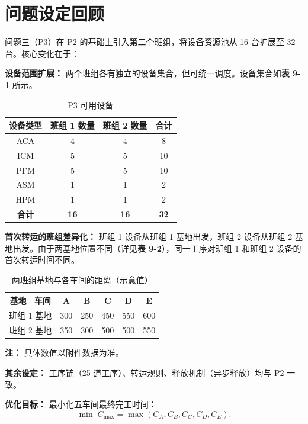\documentclass[UTF8,a4paper,12pt]{ctexart}
\begin{document}
\section{问题设定回顾}
问题三（P3）在 P2 的基础上引入第二个班组，将设备资源池从 16 台扩展至 32 台。核心变化在于：

\textbf{设备范围扩展：} 两个班组各有独立的设备集合，但可统一调度。设备集合如\textbf{表 9-1} 所示。

\begin{table}[htbp]
  \centering
  \caption{P3 可用设备}
  \label{tab:p3_device}
  \begin{tabular}{cccc}
    \toprule
    设备类型 & 班组 1 数量 & 班组 2 数量 & 合计 \\
    \midrule
    ACA & 4 & 4 & 8 \\
    ICM & 5 & 5 & 10 \\
    PFM & 5 & 5 & 10 \\
    ASM & 1 & 1 & 2 \\
    HPM & 1 & 1 & 2 \\
    \textbf{合计} & \textbf{16} & \textbf{16} & \textbf{32} \\
    \bottomrule
  \end{tabular}
\end{table}

\textbf{首次转运的班组差异化：} 班组 1 设备从班组 1 基地出发，班组 2 设备从班组 2 基地出发。由于两基地位置不同（详见\textbf{表 9-2}），同一工序对班组 1 和班组 2 设备的首次转运时间不同。

\begin{table}[htbp]
  \centering
  \caption{两班组基地与各车间的距离（示意值）}
  \label{tab:base_distance}
  \begin{tabular}{cccccc}
    \toprule
    基地 \ 车间 & A & B & C & D & E \\
    \midrule
    班组 1 基地 & 300 & 250 & 450 & 550 & 600 \\
    班组 2 基地 & 350 & 300 & 500 & 500 & 550 \\
    \bottomrule
  \end{tabular}
\end{table}
\noindent \textbf{注：} 具体数值以附件数据为准。

\textbf{其余设定：} 工序链（25 道工序）、转运规则、释放机制（异步释放）均与 P2 一致。

\textbf{优化目标：} 最小化五车间最终完工时间：
\begin{equation}
\min \; C_{\max} = \max(C_A, C_B, C_C, C_D, C_E). \tag{9-1}
\end{equation}
\end{document}
